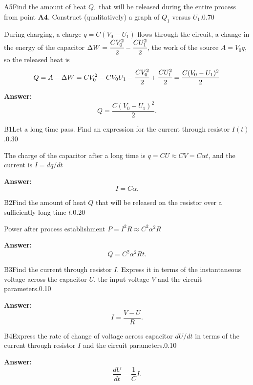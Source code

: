 \documentclass[11pt,a4paper]{article}
\begin{document}
\begin{solcard}{A5}{Find the amount of heat $Q_1$ that will be released during the entire process from point \textbf{A4}. Construct (qualitatively) a graph of $Q_1$ versus $U_1$.}{0.70}

During charging, a charge $q = C (V_0 - U_1)$ flows through the circuit, a change in the energy of the capacitor $\Delta W = \cfrac{C V_0^2}{2}-\cfrac{C U_1^2}{2}$, the work of the source $A = V_0 q$, so the released heat is $$ Q = A - \Delta W = C V_0^2 - C V_0 U_1 -  \cfrac{C V_0^2}{2} + \cfrac{C U_1^2}{2} = \frac{C (V_0 - U_1)^2}{2} $$

\par\smallskip\noindent\textbf{Answer:} $$ Q= \frac{C (V_0 - U_1)^2}{2}. $$
\end{solcard}

\begin{solcard}{B1}{Let a long time pass. Find an expression for the current through resistor $I(t)$.}{0.30}

The charge of the capacitor after a long time is $q = CU \approx C V = C \alpha t$, and the current is $I = dq/dt$

\par\smallskip\noindent\textbf{Answer:} $$ I = C \alpha. $$
\end{solcard}

\begin{solcard}{B2}{Find the amount of heat $Q$ that will be released on the resistor over a sufficiently long time $t$.}{0.20}

Power after process establishment $P = I^2 R \approx C^2 \alpha^2 R$

\par\smallskip\noindent\textbf{Answer:} $$ Q = C^2 \alpha^2 Rt. $$
\end{solcard}

\begin{solcard}{B3}{Find the current through resistor $I$. Express it in terms of the instantaneous voltage across the capacitor $U$, the input voltage $V$ and the circuit parameters.}{0.10}
\par\smallskip\noindent\textbf{Answer:} $$ I = \frac{V - U}{R}. $$
\end{solcard}

\begin{solcard}{B4}{Express the rate of change of voltage across capacitor $dU/dt$ in terms of the current through resistor $I$ and the circuit parameters.}{0.10}
\par\smallskip\noindent\textbf{Answer:} $$ \frac{dU}{dt} = \frac{1}{C} I. $$
\end{solcard}
\end{document}
